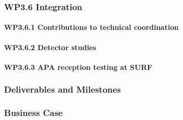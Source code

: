 \subsubsection{WP3.6 Integration}
\paragraph{WP3.6.1 Contributions to technical coordination}
\paragraph{WP3.6.2 Detector studies}
\paragraph{WP3.6.3 APA reception testing at SURF}

\subsubsection{Deliverables and Milestones}

\subsubsection{Business Case}
